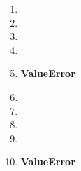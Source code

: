 \begin{multicols}{3}
    \begin{enumerate}
        \item {}
        \item {}
        \item {}
        \item {}
        \item \textbf{ValueError}
        \item {}
        \item {}
        \item {}
        \item {}
        \item \textbf{ValueError}
    \end{enumerate}
\end{multicols}

